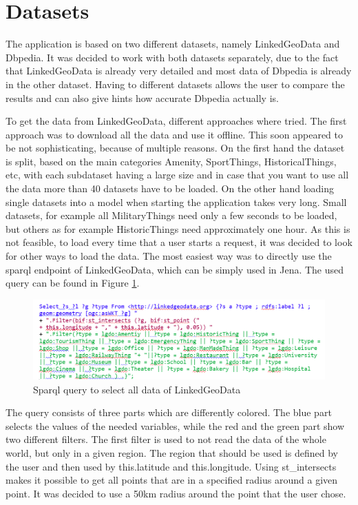 \section{Datasets}
The application is based on two different datasets, namely LinkedGeoData and Dbpedia. It was decided to work with both datasets separately, due to the fact that LinkedGeoData is already very detailed and most data of Dbpedia is already in the other dataset. Having to different datasets allows the user to compare the results and can also give hints how accurate Dbpedia actually is. 

To get the data from LinkedGeoData, different approaches where tried. The first approach was to download all the data and use it offline. This soon appeared to be not sophisticating, because of multiple reasons. On the first hand the dataset is split, based on the main categories Amenity, SportThings, HistoricalThings, etc, with each subdataset having a large size and in case that you want to use all the data more than 40 datasets have to be loaded. On the other hand loading single datasets into a model when starting the application takes very long. Small datasets, for example all MilitaryThings need only a few seconds to be loaded, but others as for example HistoricThings need approximately one hour. As this is not feasible, to load every time that a user starts a request, it was decided to look for other ways to load the data. The most easiest way was to directly use the sparql endpoint of LinkedGeoData, which can be simply used in Jena. The used query can be found in Figure \ref{fig:sparqlLGD}. 

\begin{figure}
	\centering
	\includegraphics[scale=0.7]{./content/sparqlLGD.png}
	\caption{Sparql query to select all data of LinkedGeoData}\label{fig:sparqlLGD}
\end{figure}

The query consists of three parts which are differently colored. The blue part selects the values of the needed variables, while the red and the green part show two different filters. The first filter is used to not read the data of the whole world, but only in a given region. The region that should be used is defined by the user and then used by this.latitude and this.longitude. Using st\_intersects makes it possible to get all points that are in a specified radius around a given point. It was decided to use a 50km radius around the point that the user chose. 

